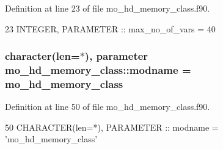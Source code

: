 Definition at line 23 of file mo\+\_\+hd\+\_\+memory\+\_\+class.\+f90.


\begin{DoxyCode}
23   \textcolor{keywordtype}{INTEGER}, \textcolor{keywordtype}{PARAMETER} :: max\_no\_of\_vars = 40
\end{DoxyCode}
\hypertarget{namespacemo__hd__memory__class_afa4e8202a33ac7bbba47914da1153507}{}
\subsubsection[{modname}]{\setlength{\rightskip}{0pt plus 5cm}character(len=$\ast$), parameter mo\+\_\+hd\+\_\+memory\+\_\+class\+::modname = \textquotesingle{}mo\+\_\+hd\+\_\+memory\+\_\+class\textquotesingle{}}\label{namespacemo__hd__memory__class_afa4e8202a33ac7bbba47914da1153507}


Definition at line 50 of file mo\+\_\+hd\+\_\+memory\+\_\+class.\+f90.


\begin{DoxyCode}
50   \textcolor{keywordtype}{CHARACTER(len=*)}, \textcolor{keywordtype}{PARAMETER} :: modname = \textcolor{stringliteral}{'mo\_hd\_memory\_class'}
\end{DoxyCode}
